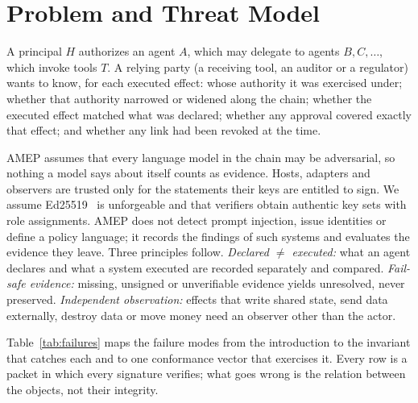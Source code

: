 \documentclass[conference]{IEEEtran}
\newcommand{\pres}{\textsf{preserved}}
\newcommand{\unres}{\textsf{unresolved}}
\begin{document}
\section{Problem and Threat Model}

A principal $H$ authorizes an agent $A$, which may delegate to agents $B, C, \dots$, which invoke tools $T$. A relying party (a receiving tool, an auditor or a regulator) wants to know, for each executed effect: whose authority it was exercised under; whether that authority narrowed or widened along the chain; whether the executed effect matched what was declared; whether any approval covered exactly that effect; and whether any link had been revoked at the time.

AMEP assumes that every language model in the chain may be adversarial, so nothing a model says about itself counts as evidence. Hosts, adapters and observers are trusted only for the statements their keys are entitled to sign. We assume Ed25519~\cite{rfc8032} is unforgeable and that verifiers obtain authentic key sets with role assignments. AMEP does not detect prompt injection, issue identities or define a policy language; it records the findings of such systems and evaluates the evidence they leave. Three principles follow. \emph{Declared $\neq$ executed:} what an agent declares and what a system executed are recorded separately and compared. \emph{Fail-safe evidence:} missing, unsigned or unverifiable evidence yields \unres{}, never \pres{}. \emph{Independent observation:} effects that write shared state, send data externally, destroy data or move money need an observer other than the actor.

Table~\ref{tab:failures} maps the failure modes from the introduction to the invariant that catches each and to one conformance vector that exercises it. Every row is a packet in which every signature verifies; what goes wrong is the relation between the objects, not their integrity.
\end{document}
